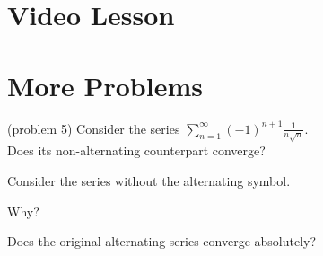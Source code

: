 \documentclass{ximera}
\begin{document}
\section{Video Lesson}




\begin{center}
\begin{foldable}
\end{foldable}
\end{center}


\section{More Problems}



\begin{problem}(problem 5)
Consider the series $\displaystyle{\sum_{n=1}^\infty (-1)^{n+1} \frac{1}{n\sqrt n}}$.\\
Does its non-alternating counterpart converge?
\begin{hint} 
Consider the series without the alternating symbol.
\end{hint}
\begin{multipleChoice}
\end{multipleChoice}

Why?
\begin{multipleChoice}
\end{multipleChoice}


Does the original alternating series converge absolutely?
\begin{multipleChoice}
\end{multipleChoice}

\end{problem}
\end{document}
